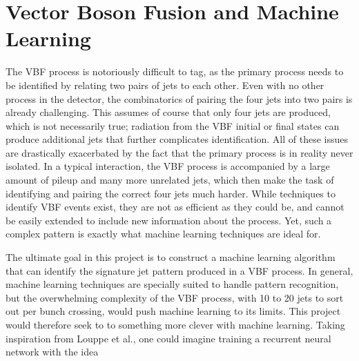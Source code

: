 \documentclass[12pt,letterpaper]{article}
\begin{document}
\section*{Vector Boson Fusion and Machine Learning}
    The VBF process is notoriously difficult to tag, as the primary process needs to be identified by relating two pairs of jets to each other. Even with no other process in the detector, the combinatorics of pairing the four jets into two pairs is already challenging. This assumes of course that only four jets are produced, which is not necessarily true; radiation from the VBF initial or final states can produce additional jets that further complicates identification. All of these issues are drastically exacerbated by the fact that the primary process is in reality never isolated. In a typical interaction, the VBF process is accompanied by a large amount of pileup and many more unrelated jets, which then make the task of identifying and pairing the correct four jets much harder. While techniques to identify VBF events exist, they are not as efficient as they could be, and cannot be easily extended to include new information about the process. Yet, such a complex pattern is exactly what machine learning techniques are ideal for.


    The ultimate goal in this project is to construct a machine learning algorithm that can identify the signature jet pattern produced in a VBF process. In general, machine learning techniques are specially suited to handle pattern recognition, but the overwhelming complexity of the VBF process, with 10 to 20 jets to sort out per bunch crossing, would push machine learning to its limits. This project would therefore seek to to something more clever with machine learning. Taking inspiration from Louppe et al.\cite{Louppe:2017ipp}, one could imagine training a recurrent neural network with the idea 

    


    
    
\end{document}
